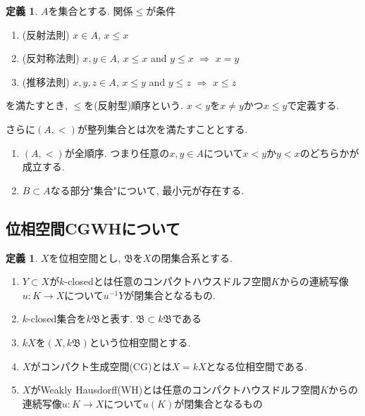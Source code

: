 \documentclass[dvipdfmx,a4paper,11pt]{article}
\theoremstyle{definition}
\newtheorem{dfn}[thm]{定義}
\begin{document}
\begin{tcolorbox}[colback = white, colframe = green!35!black, fonttitle = \bfseries,breakable = true]
 \begin{dfn}
 $A$を集合とする. 関係$\le$が条件
 \begin{enumerate}
 \item (反射法則) $x \in A$, $x \le x$
 \item (反対称法則) $x,y \in A$, $x \le x$ and $y \le x$ $\Rightarrow$ $x=y$
 \item (推移法則) $x,y, z\in A$, $x \le y$ and $y \le z$ $\Rightarrow$ $x\le z$
 \end{enumerate}
を満たすとき, $\le$を(反射型)順序という.
$x< y$を$x \neq y$かつ$x \le y$で定義する. 

さらに$(A,<)$が整列集合とは次を満たすこととする. 
 \begin{enumerate}
 \item  $(A,<)$が全順序. つまり任意の$x, y \in A$について$x <y$か$y < x$のどちらかが成立する.
 \item $B \subset A$なる部分"集合"について, 最小元が存在する. 
 \end{enumerate}
\end{dfn}
 \end{tcolorbox}

\subsection{位相空間CGWHについて}
\label{subsec-CGWH}
\begin{tcolorbox}
 [colback = white, colframe = green!35!black, fonttitle = \bfseries,breakable = true]
\begin{dfn}\cite[Definition 1.1 ,1.2]{Str}
$X$を位相空間とし, $\mathfrak{B}$を$X$の閉集合系とする. 
\begin{enumerate}
\item $Y \subset X$が$k$-closedとは任意のコンパクトハウスドルフ空間$K$からの連続写像$u : K \to X$について$u^{-1}Y$が閉集合となるもの. 
\item $k$-closed集合を$k\mathfrak{B}$と表す. $\mathfrak{B} \subset k \mathfrak{B}$である
\item $kX$を$(X, k\mathfrak{B})$という位相空間とする. 
\item $X$がコンパクト生成空間(CG)とは$X = kX$となる位相空間である.
\item $X$がWeakly Hausdorff(WH)とは任意のコンパクトハウスドルフ空間$K$からの連続写像$u : K \to X$について$u(K)$が閉集合となるもの
\end{enumerate}
\end{dfn}
\end{tcolorbox}
\end{document}
